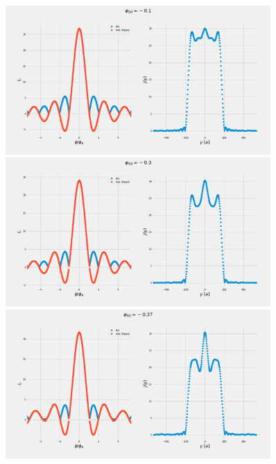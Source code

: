 \documentclass[a4paper]{article}
\begin{document}
\begin{figure}
	\includegraphics[width=0.9\textwidth]{figs/wg32/current_and_density_01}
	\includegraphics[width=0.9\textwidth]{figs/wg32/current_and_density_03}
	\includegraphics[width=0.9\textwidth]{figs/wg32/current_and_density_037}
\end{figure}
\end{document}
